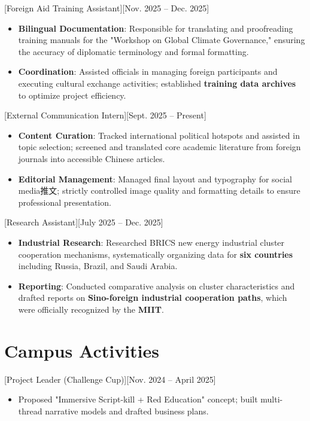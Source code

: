 \documentclass[a4paper]{resume}
\begin{document}
[Foreign Aid Training Assistant][Nov. 2025 -- Dec. 2025]
\begin{itemize}
    \item \textbf{Bilingual Documentation}: Responsible for translating and proofreading training manuals for the "Workshop on Global Climate Governance," ensuring the accuracy of diplomatic terminology and formal formatting.
    \item \textbf{Coordination}: Assisted officials in managing foreign participants and executing cultural exchange activities; established \textbf{training data archives} to optimize project efficiency.
\end{itemize}

[External Communication Intern][Sept. 2025 -- Present]
\begin{itemize}
    \item \textbf{Content Curation}: Tracked international political hotspots and assisted in topic selection; screened and translated core academic literature from foreign journals into accessible Chinese articles.
    \item \textbf{Editorial Management}: Managed final layout and typography for social media推文; strictly controlled image quality and formatting details to ensure professional presentation.
\end{itemize}

[Research Assistant][July 2025 -- Dec. 2025]
\begin{itemize}
    \item \textbf{Industrial Research}: Researched BRICS new energy industrial cluster cooperation mechanisms, systematically organizing data for \textbf{six countries} including Russia, Brazil, and Saudi Arabia.
    \item \textbf{Reporting}: Conducted comparative analysis on cluster characteristics and drafted reports on \textbf{Sino-foreign industrial cooperation paths}, which were officially recognized by the \textbf{MIIT}.
\end{itemize}

\section{Campus Activities}

[Project Leader (Challenge Cup)][Nov. 2024 -- April 2025]
\begin{itemize}
    \item Proposed "Immersive Script-kill + Red Education" concept; built multi-thread narrative models and drafted business plans.
\end{itemize}
\end{document}
